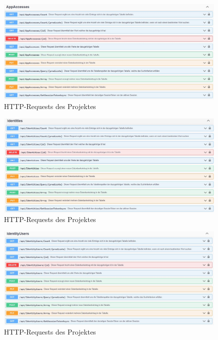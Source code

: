 \begin{figure}[H]
    \centering
    \includegraphics[width=1.6\textwidth]{pics/WebApiRequests2.JPG}
    \caption{HTTP-Requests des Projektes}
\end{figure}

\begin{figure}[H]
    \centering
    \includegraphics[width=1.6\textwidth]{pics/WebApiRequests3.JPG}
    \caption{HTTP-Requests des Projektes}
\end{figure}

\begin{figure}[H]
    \centering
    \includegraphics[width=1.6\textwidth]{pics/WebApiRequests4.JPG}
    \caption{HTTP-Requests des Projektes}
\end{figure}

